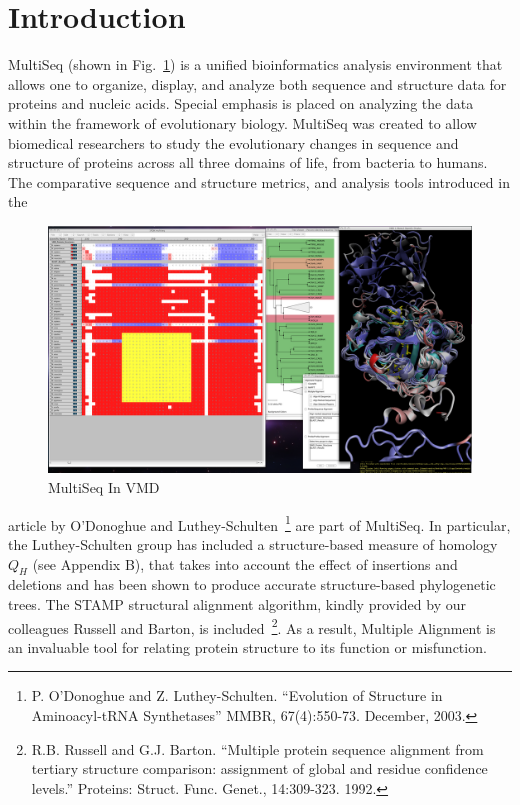 \label{unit0}


\section{Introduction}



MultiSeq 
(shown in Fig.~\ref{fullDisplay}) 
is a unified bioinformatics analysis environment that allows one to
organize, display, and analyze both sequence and structure data for
proteins and nucleic acids. Special emphasis is placed on analyzing the
data within the framework of evolutionary biology.
MultiSeq was created to allow biomedical researchers to study the
evolutionary changes in sequence and structure of proteins across all
three domains of life, from bacteria to humans.  The comparative
sequence and structure metrics, and analysis tools introduced in the
\begin{figure}[here]
 \centerline{\includegraphics [width=5in]{./pictures/screenShot20110307.png}}
 \caption{MultiSeq In VMD}
\label{fullDisplay}
\end{figure}
article by O'Donoghue and Luthey-Schulten~\footnote {P.
O'Donoghue and Z. Luthey-Schulten. ``Evolution of Structure in
Aminoacyl-tRNA Synthetases''  MMBR, 67(4):550-73.  December, 2003. }
are part of MultiSeq.   In particular,  the Luthey-Schulten
group has included a structure-based measure of
homology \begin{math} Q_H \end{math} (see Appendix B), that takes into
account the effect of insertions and deletions and has been shown to
produce accurate structure-based phylogenetic trees.  The STAMP
structural alignment algorithm, kindly provided by our colleagues
Russell and Barton, is included~\footnote {R.B.
Russell and G.J. Barton. ``Multiple protein sequence alignment from
tertiary structure comparison: assignment of global and residue
confidence levels.''  Proteins: Struct. Func. Genet., 14:309-323.  1992.
}.  
As a result, Multiple Alignment is an invaluable tool for relating
protein structure to its function or misfunction.

